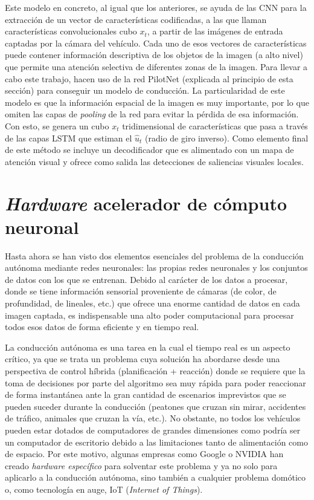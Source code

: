 Este modelo en concreto, al igual que los anteriores, se ayuda de las CNN para la extracción de un vector de características codificadas, a las que llaman características convolucionales cubo $x_t$, a partir de las imágenes de entrada captadas por la cámara del vehículo. Cada uno de esos vectores de características puede contener información descriptiva de los objetos de la imagen (a alto nivel) que permite una atención selectiva de diferentes zonas de la imagen. Para llevar a cabo este trabajo, hacen uso de la red PilotNet (explicada al principio de esta sección) para conseguir un modelo de conducción. La particularidad de este modelo es que la información espacial de la imagen es muy importante, por lo que omiten las capas de \textit{pooling} de la red para evitar la pérdida de esa información. Con esto, se genera un cubo $x_t$ tridimensional de características que pasa a través de las capas LSTM que estiman el $\hat{u}_t$ (radio de giro inverso). Como elemento final de este método se incluye un decodificador que es alimentado con un mapa de atención visual y ofrece como salida las detecciones de saliencias visuales locales.


\section{\textit{Hardware} acelerador de cómputo neuronal}

Hasta ahora se han visto dos elementos esenciales del problema de la conducción autónoma mediante redes neuronales: las propias redes neuronales y los conjuntos de datos con los que se entrenan. Debido al carácter de los datos a procesar, donde se tiene información sensorial proveniente de cámaras (de color, de profundidad, de lineales, etc.) que ofrece una enorme cantidad de datos en cada imagen captada, es indispensable una alto poder computacional para procesar todos esos datos de forma eficiente y en tiempo real.

La conducción autónoma es una tarea en la cual el tiempo real es un aspecto crítico, ya que se trata un problema cuya solución ha abordarse desde una perspectiva de control híbrida (planificación + reacción) donde se requiere que la toma de decisiones por parte del algoritmo sea muy rápida para poder reaccionar de forma instantánea ante la gran cantidad de escenarios imprevistos que se pueden suceder durante la conducción (peatones que cruzan sin mirar, accidentes de tráfico, animales que cruzan la vía, etc.). No obstante, no todos los vehículos pueden estar dotados de computadores de grandes dimensiones como podría ser un computador de escritorio debido a las limitaciones tanto de alimentación como de espacio. Por este motivo, algunas empresas como Google o NVIDIA han creado \textit{hardware específico} para solventar este problema y ya no solo para aplicarlo a la conducción autónoma, sino también a cualquier problema domótico o, como tecnología en auge, IoT (\textit{Internet of Things}). 

